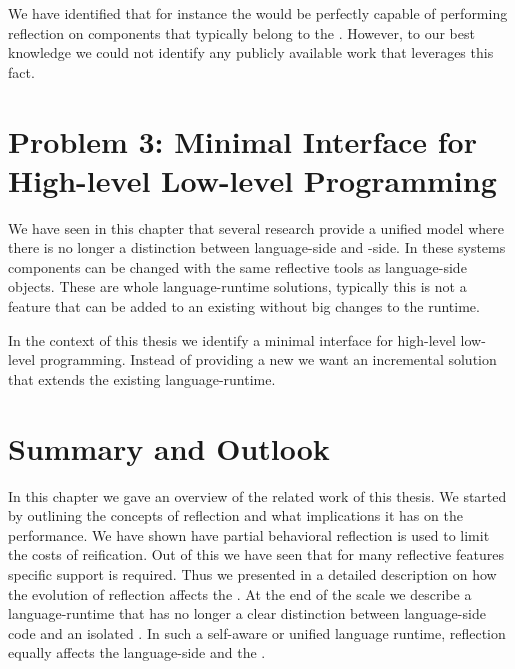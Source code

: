 We have identified that for instance the \Klein \VM would be perfectly capable of performing reflection on components that typically belong to the \VM.
However, to our best knowledge we could not identify any publicly available work that leverages this fact.


\section{Problem 3: Minimal Interface for High-level Low-level Programming}
We have seen in this chapter that several research \VMs provide a unified model where there is no longer a distinction between language-side and \VM-side.
In these systems \VM components can be changed with the same reflective tools as language-side objects.
These are whole language-runtime solutions, typically this is not a feature that can be added to an existing \VM without big changes to the runtime.

In the context of this thesis we identify a minimal interface for high-level low-level programming.
Instead of providing a new \VM we want an incremental solution that extends the existing language-runtime.


\section{Summary and Outlook}

In this chapter we gave an overview of the related work of this thesis.
We started by outlining the concepts of reflection and what implications it has on the performance.
We have shown have partial behavioral reflection is used to limit the costs of reification.
Out of this we have seen that for many reflective features specific \VM support is required.
Thus we presented in  a detailed description on how the evolution of reflection affects the \VM.
At the end of the scale we describe a language-runtime that has no longer a clear distinction between language-side code and an isolated \VM.
In such a self-aware \VM or unified language runtime, reflection equally affects the language-side and the \VM.

